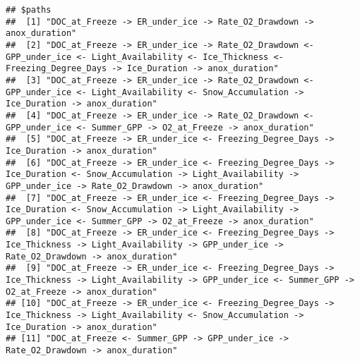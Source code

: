 \documentclass[]{article}
\begin{document}
\begin{verbatim}
## $paths
##  [1] "DOC_at_Freeze -> ER_under_ice -> Rate_O2_Drawdown -> anox_duration"                                                                                                                                                             
##  [2] "DOC_at_Freeze -> ER_under_ice -> Rate_O2_Drawdown <- GPP_under_ice <- Light_Availability <- Ice_Thickness <- Freezing_Degree_Days -> Ice_Duration -> anox_duration"                                                             
##  [3] "DOC_at_Freeze -> ER_under_ice -> Rate_O2_Drawdown <- GPP_under_ice <- Light_Availability <- Snow_Accumulation -> Ice_Duration -> anox_duration"                                                                                 
##  [4] "DOC_at_Freeze -> ER_under_ice -> Rate_O2_Drawdown <- GPP_under_ice <- Summer_GPP -> O2_at_Freeze -> anox_duration"                                                                                                              
##  [5] "DOC_at_Freeze -> ER_under_ice <- Freezing_Degree_Days -> Ice_Duration -> anox_duration"                                                                                                                                         
##  [6] "DOC_at_Freeze -> ER_under_ice <- Freezing_Degree_Days -> Ice_Duration <- Snow_Accumulation -> Light_Availability -> GPP_under_ice -> Rate_O2_Drawdown -> anox_duration"                                                         
##  [7] "DOC_at_Freeze -> ER_under_ice <- Freezing_Degree_Days -> Ice_Duration <- Snow_Accumulation -> Light_Availability -> GPP_under_ice <- Summer_GPP -> O2_at_Freeze -> anox_duration"                                               
##  [8] "DOC_at_Freeze -> ER_under_ice <- Freezing_Degree_Days -> Ice_Thickness -> Light_Availability -> GPP_under_ice -> Rate_O2_Drawdown -> anox_duration"                                                                             
##  [9] "DOC_at_Freeze -> ER_under_ice <- Freezing_Degree_Days -> Ice_Thickness -> Light_Availability -> GPP_under_ice <- Summer_GPP -> O2_at_Freeze -> anox_duration"                                                                   
## [10] "DOC_at_Freeze -> ER_under_ice <- Freezing_Degree_Days -> Ice_Thickness -> Light_Availability <- Snow_Accumulation -> Ice_Duration -> anox_duration"                                                                             
## [11] "DOC_at_Freeze <- Summer_GPP -> GPP_under_ice -> Rate_O2_Drawdown -> anox_duration"                                                                                                                                              

\end{verbatim}
\end{document}
